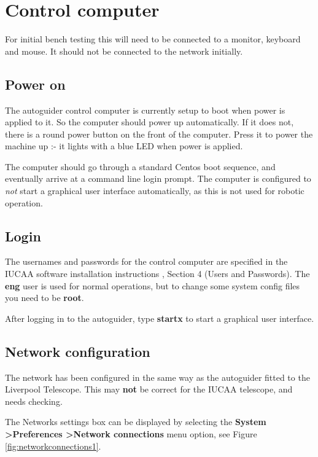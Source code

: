 \documentclass[10pt,a4paper]{article}
\begin{document}
\section{Control computer}

For initial bench testing this will need to be connected to a monitor, keyboard and mouse. It should not be connected to the network initially.

\subsection{Power on}

The autoguider control computer is currently setup to boot when power is applied to it. So the computer should power up automatically. If it does not, there is a round power button on the front of the computer. Press it to power the machine up :- it lights with a blue LED when power is applied.

The computer should go through a standard Centos boot sequence, and eventually arrive at a command line login prompt. The computer is configured to {\em not} start a graphical user interface automatically, as this is not used for robotic operation.

\subsection{Login}

The usernames and passwords for the control computer are specified in the IUCAA software installation instructions \cite{bib:iucaasoftwareinstallation}, Section 4 (Users and Passwords). The {\bf eng} user is used for normal operations, but to change some system config files you need to be {\bf root}.

After logging in to the autoguider, type {\bf startx} to start a graphical user interface.

\subsection{Network configuration}

The network has been configured in the same way as the autoguider fitted to the Liverpool Telescope. This may {\bf not} be correct for the IUCAA telescope, and needs checking.

The Networks settings box can be displayed by selecting the  {\bf System \textgreater Preferences \textgreater Network connections} menu option, see Figure \ref{fig:networkconnections1}.
\end{document}
